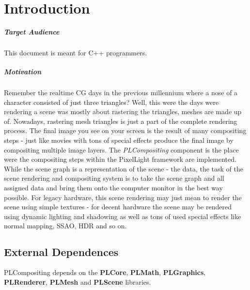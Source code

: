 \chapter{Introduction}


\paragraph{Target Audience}
This document is meant for C++ programmers.


\paragraph{Motivation}
Remember the realtime CG days in the previous millennium where a nose of a character consisted of just three triangles? Well, this were the days were rendering a scene was mostly about rastering the triangles, meshes are made up of. Nowadays, rastering mesh triangles is just a part of the complete rendering process. The final image you see on your screen is the result of many compositing steps - just like movies with tons of special effects produce the final image by compositing multiple image layers. The \emph{PLCompositing} component is the place were the compositing steps within the PixelLight framework are implemented. While the scene graph is a representation of the scene - the data, the task of the scene rendering and compositing system is to take the scene graph and all assigned data and bring them onto the computer monitor in the best way possible. For legacy hardware, this scene rendering may just mean to render the scene using simple textures - for decent hardware the scene may be rendered using dynamic lighting and shadowing as well as tons of used special effects like normal mapping, \ac{SSAO}, \ac{HDR} and so on.




\section{External Dependences}
PLCompositing depends on the \textbf{PLCore}, \textbf{PLMath}, \textbf{PLGraphics}, \textbf{PLRenderer}, \textbf{PLMesh} and \textbf{PLScene} libraries.
